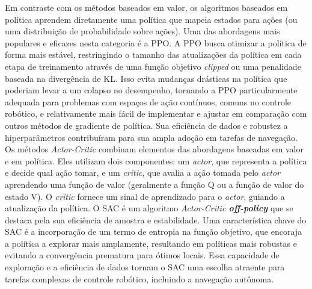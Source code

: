 Em contraste com os métodos baseados em valor, os algoritmos baseados em política aprendem diretamente uma política que mapeia estados para ações (ou uma distribuição de probabilidade sobre ações). Uma das abordagens mais populares e eficazes nesta categoria é a \ac{PPO}. A \ac{PPO} busca otimizar a política de forma mais estável, restringindo o tamanho das atualizações da política em cada etapa de treinamento através de uma função objetivo \textit{clipped} ou uma penalidade baseada na divergência de \ac{KL}. Isso evita mudanças drásticas na política que poderiam levar a um colapso no desempenho, tornando a \ac{PPO} particularmente adequada para problemas com espaços de ação contínuos, comuns no controle robótico, e relativamente mais fácil de implementar e ajustar em comparação com outros métodos de gradiente de política. Sua eficiência de dados e robustez a hiperparâmetros contribuíram para sua ampla adoção em tarefas de navegação.
Os métodos \textit{Actor-Critic} combinam elementos das abordagens baseadas em valor e em política. Eles utilizam dois componentes: um \textit{actor}, que representa a política e decide qual ação tomar, e um \textit{critic}, que avalia a ação tomada pelo \textit{actor} aprendendo uma função de valor (geralmente a função Q ou a função de valor do estado V). O \textit{critic} fornece um sinal de aprendizado para o \textit{actor}, guiando a atualização da política. O \ac{SAC} é um algoritmo \textit{Actor-Critic \textbf{off-policy}} que se destaca pela sua eficiência de amostra e estabilidade. Uma característica chave do \ac{SAC} é a incorporação de um termo de entropia na função objetivo, que encoraja a política a explorar mais amplamente, resultando em políticas mais robustas e evitando a convergência prematura para ótimos locais. Essa capacidade de exploração e a eficiência de dados tornam o SAC uma escolha atraente para tarefas complexas de controle robótico, incluindo a navegação autônoma.

